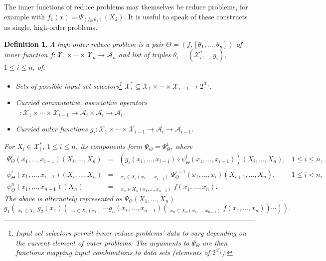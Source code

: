 \documentclass{article}
\newtheorem{definition} {Definition}
\newcommand{\OpSym}{\mathrm{O\!p}}
\newcommand{\opsym}{{\scriptstyle \mathrm{o\!p}}}
\newcommand{\OpCurry}[3][]{\mathop{\OpSym^{#1}_{#2}{#3}}}
\newcommand{\opcurry}[3][]{\mathop{\opsym^{#1}_{#2}{#3}}}
\newcommand{\Op}[2][]{\OpCurry[#1]{#2}{}}
\newcommand{\op}[2][]{\opcurry[#1]{#2}{}}
\newcommand{\comp}{\mathop{\circ}\nolimits}
\newcommand{\GNP}{\psi_{\Theta}}
\begin{document}
The inner functions of reduce problems may themselves be reduce
problems, for example with $f_1(x) = \Psi_{(f_2,\theta_2)}(X_2)$.  It
is useful to speak of these constructs as single, high-order problems.
\begin{definition}
  A {\em high-order reduce problem} is a pair $\Theta =
  (f,[\theta_1,\ldots,\theta_n])$ of inner function \mbox{$f \colon
  \mathcal{X}_1\times\cdots\times\mathcal{X}_n\to\mathcal{A}_n$}
  and list of triples $\theta_i = (\mathcal{X}^*_i,\op{i},g_i)$, $1
  \leq i \leq n$, of:
  \begin{itemize}
  \item Sets of possible input set selectors\footnote{Input set
    selectors permit inner reduce problems' data to vary depending on
    the current element of outer problems.  The arguments to
    $\Psi_{\Theta}$ are then functions mapping input combinations to
    data sets (elements of $2^{\mathcal{X}_i}$).}  $\mathcal{X}^*_i
    \subseteq \mathcal{X}_1 \times \cdots \times \mathcal{X}_{i-1} \to
    2^{\mathcal{X}_i}$.
  \item Curried commutative, associative operators $\op{i} \colon
    \mathcal{X}_1 \times \cdots \times \mathcal{X}_{i-1} \to
    \mathcal{A}_i \times \mathcal{A}_i \to \mathcal{A}_i$.
  \item Curried outer functions $g_i \colon \mathcal{X}_1 \times
    \cdots \times \mathcal{X}_{i-1} \to \mathcal{A}_i \to
    \mathcal{A}_{i-1}$.
  \end{itemize}
  For $X_i \in \mathcal{X}^*_i$, $1 \leq i \leq n$, its components
  form $\Psi_{\Theta} = \Psi_{\Theta}^1$, where
  \[ \begin{array}{rclr}
    \Psi_{\Theta}^i{\scriptstyle (x_1,\ldots,x_{i-1})}(X_i,\ldots,X_n) & = & \left( g_i{\scriptstyle (x_1,\ldots,x_{i-1})} \comp \GNP^i{\scriptstyle (x_1,\ldots,x_{i-1})} \right) (X_i,\ldots,X_n), & 1 \leq i \leq n, \\
    \GNP^i{\scriptstyle (x_1,\ldots,x_{i-1})}(X_i,\ldots,X_n) & = & \displaystyle \OpCurry{i}{\scriptstyle (x_1,\ldots,x_{i-1})}_{x_i \in X_i(x_1,\ldots,x_{i-1})} \Psi_{\Theta}^{i+1}{\scriptstyle (x_1,\ldots,x_i)} (X_{i+1},\ldots,X_n), & 1 \leq i < n, \\
    \GNP^n{\scriptstyle (x_1,\ldots,x_{n-1})}(X_n) & = & \displaystyle \OpCurry{n}{\scriptstyle (x_1,\ldots,x_{n-1})}_{x_n \in X_n(x_1,\ldots,x_{n-1})} f(x_1,\ldots,x_n).
  \end{array} \]
  The above is alternately represented as $\Psi_{\Theta}(X_1,\ldots,X_n) =$
  \[
  g_1 \left( \Op{1}_{x_1 \in X_1} g_2{\scriptstyle (x_1)} \left( \OpCurry{2}{\scriptstyle (x_1)}_{x_2 \in X_2(x_1)} \cdots g_n{\scriptstyle (x_1,\ldots,x_{n-1})} \left( \OpCurry{n}{\scriptstyle (x_1,\ldots,x_{n-1})}_{x_n \in X_n(x_1,\ldots,x_{n-1})} f(x_1,\ldots,x_n) \right) \cdots \right) \right) .
  \]
\end{definition}
\end{document}
